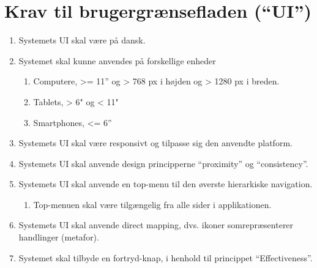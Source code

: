 \section{Krav til brugergrænsefladen (“UI”)}
\begin{enumerate}
	\item Systemets UI skal være på dansk.
	\item Systemet skal kunne anvendes på forskellige enheder
	\begin{enumerate}
		\item Computere, >= 11” og > 768 px i højden og > 1280 px i breden.
		\item Tablets, > 6" og < 11"
		\item Smartphones, <= 6”
	\end{enumerate}
	\item Systemets UI skal være responsivt og tilpasse sig den anvendte platform.
	\item Systemets UI skal anvende design principperne “proximity” og “consistency”.
	\item Systemets UI skal anvende en top-menu til den øverste hierarkiske navigation. 
	\begin{enumerate}	
		\item Top-menuen skal være tilgængelig fra alle sider i applikationen. 
	\end{enumerate}
	\item Systemets UI skal anvende direct mapping, dvs. ikoner somrepræsenterer handlinger (metafor).
	\item Systemet skal tilbyde en fortryd-knap, i henhold til princippet “Effectiveness”.
\end{enumerate}